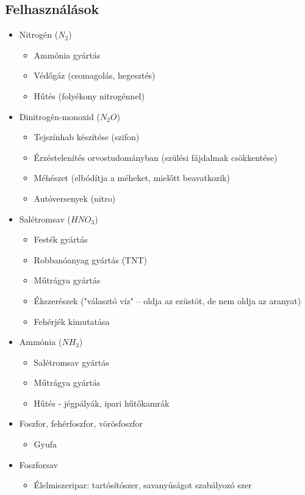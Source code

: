 \documentclass{article}
\begin{document}
\subsection{Felhasználások}
\begin{itemize}
    \item Nitrogén ($N_2$)
    \begin{itemize}
        \item Ammónia gyártás
        \item Védőgáz (csomagolás, hegesztés)
        \item Hűtés (folyékony nitrogénnel)
    \end{itemize}
    \item Dinitrogén-monoxid ($N_2O$)
    \begin{itemize}
        \item Tejszínhab készítése (szifon)
        \item Érzéstelenítés orvostudományban (szülési fájdalmak csökkentése)
        \item Méhészet (elbódítja a méheket, mielőtt beavatkozik)
        \item Autóversenyek (nitro)
    \end{itemize}
    \item Salétromsav ($HNO_3$)
    \begin{itemize}
        \item Festék gyártás
        \item Robbanóanyag gyártás (TNT)
        \item Műtrágya gyártás
        \item Ékszerészek ("választó víz" -- oldja az ezüstöt, de nem oldja az aranyat)
        \item Fehérjék kimutatása
    \end{itemize}
    \item Ammónia ($NH_3$)
    \begin{itemize}
        \item Salétromsav gyártás
        \item Műtrágya gyártás
        \item Hűtés - jégpályák, ipari hűtőkamrák
    \end{itemize}
    \item Foszfor, fehérfoszfor, vörösfoszfor
    \begin{itemize}
        \item Gyufa
    \end{itemize}
    \item Foszforsav
    \begin{itemize}
        \item Élelmiszeripar: tartósítószer, savanyúságot szabályozó szer
    \end{itemize}
\end{itemize}
\end{document}
